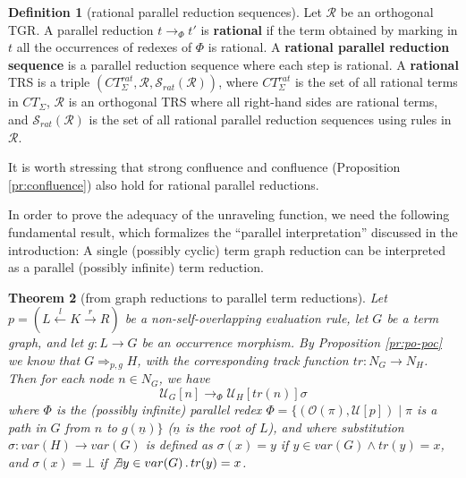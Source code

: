 \documentclass{eptcs}
\theoremstyle{plain}
\newtheorem{theorem}{Theorem} \newtheorem{lemma}[theorem]{Lemma}
\theoremstyle{definition}
\newtheorem{definition}[theorem]{Definition}
\newcommand{\varnodes}[1]{var(#1)}
\begin{document}
\begin{definition} 
[rational parallel reduction sequences]
\label{de:rational sequences}
Let $\mathcal{R}$ be an orthogonal TGR. A parallel reduction $t 
\rightarrow_\Phi t'$ is {\bf rational} if the term obtained by marking 
in $t$ all the occurrences of redexes of $\Phi$ is rational. A {\bf 
rational parallel reduction sequence} is a   parallel reduction 
sequence where each step is rational. A {\bf rational} TRS is a triple
$(CT_\Sigma^{rat}, \mathcal{R}, \mathcal{S}_{rat}(\mathcal{R}))$, where 
$CT_\Sigma^{rat}$ is 
the set of all rational terms in $CT_\Sigma$, $\mathcal{R}$ is an 
orthogonal TRS where all right-hand sides are rational terms, and 
$\mathcal{S}_{rat}(\mathcal{R})$ is the set of all rational parallel 
reduction sequences 
using rules in $\mathcal{R}$.
\end{definition}


It is worth stressing that strong confluence and confluence 
(Proposition \ref{pr:confluence}) also hold for rational parallel 
reductions. 

In order to prove the adequacy of the unraveling function, we need 
the following fundamental result, which formalizes the ``parallel
interpretation'' discussed in the introduction: 
A single (possibly cyclic) term graph 
reduction can be interpreted as a parallel (possibly infinite) term 
reduction.

\begin{theorem} 
[from graph reductions to parallel term reductions]
\label{th:soundness}
Let $p = 
(L \stackrel{l}{\leftarrow} K \stackrel{r}{\rightarrow} R)$ be a 
non-self-overlapping evaluation rule, let $G$ be a term graph, and let 
$g: L \rightarrow 
G$ be an occurrence morphism. By Proposition \ref{pr:po-poc}
we know that $G \Rightarrow_{p, g} H$, with the corresponding track 
function $tr: N_G \rightarrow N_H$. Then for each node $n \in N_G$, we 
have 
$$\mathcal{U}_G[n] \rightarrow_\Phi \mathcal{U}_H[tr(n)]\sigma$$
\noindent
where $\Phi$ is the (possibly infinite) parallel redex $\Phi = 
\{(\mathcal{O}(\pi), \mathcal{U}[p])  \mid \pi$ is a path in $G$ 
from $n$ to  $g(\underline{n}) \}$ ($\underline{n}$ is the root of 
$L$), and where substitution $\sigma: 
var(H) \rightarrow var(G)$ is defined as $\sigma(x) = y$ if $y \in 
var(G) \wedge tr(y) = x$, and $\sigma(x) = \bot$ if $\not \exists y\in 
\varnodes{G} \,.\, tr(y) = x$.
\end{theorem}
\end{document}
